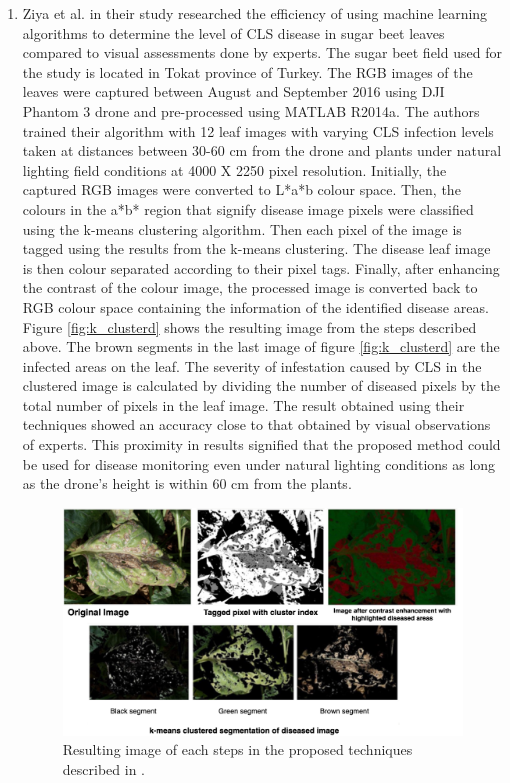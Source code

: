 \begin{enumerate}
\item Ziya et al. \cite{ziya34determination} in their study researched the efficiency of using machine learning algorithms to determine the level of CLS disease in sugar beet leaves compared to visual assessments done by experts. The sugar beet field used for the study is located in Tokat province of Turkey. The RGB images of the leaves were captured between August and September 2016 using DJI Phantom 3 drone and pre-processed using MATLAB R2014a. The authors trained their algorithm with 12 leaf images with varying CLS infection levels taken at distances between 30-60 cm from the drone and plants under natural lighting field conditions at 4000 X 2250 pixel resolution. Initially, the captured RGB images were converted to L*a*b colour space. Then, the colours in the a*b* region that signify disease image pixels were classified using the k-means clustering algorithm. Then each pixel of the image is tagged using the results from the k-means clustering. The disease leaf image is then colour separated according to their pixel tags. Finally, after enhancing the contrast of the colour image, the processed image is converted back to RGB colour space containing the information of the identified disease areas. Figure \ref{fig:k_clusterd} shows the resulting image from the steps described above. The brown segments in the last image of figure \ref{fig:k_clusterd} are the infected areas on the leaf.  The severity of infestation caused by CLS in the clustered image is calculated by dividing the number of diseased pixels by the total number of pixels in the leaf image. The result obtained using their techniques showed an accuracy close to that obtained by visual observations of experts. This proximity in results signified that the proposed method could be used for disease monitoring even under natural lighting conditions as long as the drone’s height is within 60 cm from the plants.


    \begin{figure}[htbp]
        \centerline{\includegraphics[scale=0.32]{figure/Untitled.png}}
        \caption{Resulting image of each steps in the proposed techniques described in \cite{ziya34determination}.}


\end{figure}
\end{enumerate}
